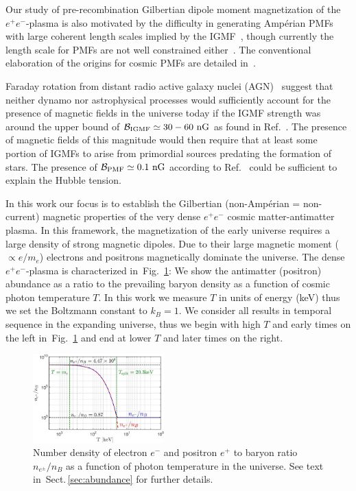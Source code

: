 \documentclass[aps,prd,floatfix,reprint]{revtex4-2}
\newcommand{\rf}[1]{Fig.~{\ref{#1}}}
\newcommand{\rsec}[1]{Sect.\,{\ref{#1}}}
\begin{document}
Our study of pre-recombination Gilbertian dipole moment magnetization of the $e^{+}e^{-}$-plasma is also motivated by the difficulty in generating Amp\'erian PMFs with large coherent length scales implied by the IGMF~\cite{Giovannini:2022rrl}, though currently the length scale for PMFs are not well constrained either~\cite{AlvesBatista:2021sln}. The conventional elaboration of the origins for cosmic PMFs are detailed in~\cite{Gaensler:2004gk,Durrer:2013pga,AlvesBatista:2021sln}.

Faraday rotation from distant radio active galaxy nuclei (AGN)~\cite{Pomakov:2022cem} suggest that neither dynamo nor astrophysical processes would sufficiently account for the presence of magnetic fields in the universe today if the IGMF strength was around the upper bound of ${\cal B}_{\rm IGMF}\simeq30-60{\rm\ nG}$ as found in Ref.~\cite{Vernstrom:2021hru}. The presence of magnetic fields of this magnitude would then require that at least some portion of IGMFs to arise from primordial sources predating the formation of stars. The presence of ${\cal B}_{\rm PMF}\simeq0.1{\rm\ nG}$ according to Ref.~\cite{Jedamzik:2020krr} could be sufficient to explain the Hubble tension. 

In this work our focus is to establish the Gilbertian (non-Amp\'erian = non-current) magnetic properties of the very dense $e^{+}e^{-}$ cosmic matter-antimatter plasma. In this framework, the magnetization of the early universe requires a large density of strong magnetic dipoles. Due to their large magnetic moment ($\propto e/m_e$) electrons and positrons magnetically dominate the universe. The dense $e^{+}e^{-}$-plasma is characterized in~\rf{fig:densityratio}: We show the antimatter (positron) abundance as a ratio to the prevailing baryon density as a function of cosmic photon temperature $T$. In this work we measure $T$ in units of energy (keV) thus we set the Boltzmann constant to $k_{B}=1$. We consider all results in temporal sequence in the expanding universe, thus we begin with high $T$ and early times on the left in~\rf{fig:densityratio} and end at lower $T$ and later times on the right.

\begin{figure}[ht]
 \centering
\includegraphics[width=0.45\textwidth]{plots/EEPlasmaDensityRatio_new01.jpg}
 \caption{Number density of electron $e^{-}$ and positron $e^{+}$ to baryon ratio $n_{e^{\pm}}/n_{B}$ as a function of photon temperature in the universe. See text in~\rsec{sec:abundance} for further details.}
 \label{fig:densityratio} 
\end{figure}
\end{document}
